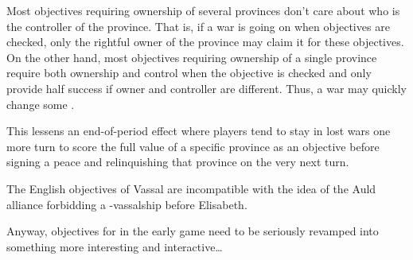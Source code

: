 \bparag Most objectives requiring ownership of several provinces don't
care about who is the controller of the province. That is, if a war is
going on when objectives are checked, only the rightful owner of the
province may claim it for these objectives.
\bparag On the other hand, most objectives requiring ownership of a
single province require both ownership and control when the objective is
checked and only provide half success if owner and controller are
different. Thus, a war may quickly change some \VPs.

\begin{designnote}
  This lessens an end-of-period effect where players tend to stay in
  lost wars one more turn to score the full \VPs value of a specific
  province as an objective before signing a peace and relinquishing that
  province on the very next turn.
\end{designnote}

\begin{todo}
  The English objectives of \paysEcosse Vassal are incompatible with the
  idea of the Auld alliance forbidding a \ANG-\paysEcosse vassalship
  before Elisabeth.

  Anyway, objectives for \ANG in the early game need to be seriously
  revamped into something more interesting and interactive\ldots
\end{todo}



\def\EUobjectives#1#2{%
  \EUcurrentcountry{#1} \csname subsection\endcsname {Objectives of
    \paysmajeur{#1}} \EUobjectivesa{I}{#2}
  \EUobjectivesa{II}{#2} \EUobjectivesa{III}{#2}
  \EUobjectivesa{IV}{#2} \EUobjectivesa{V}{#2}
  \EUobjectivesa{VI}{#2} \EUobjectivesa{VII}{#2}}
\def\EUobjectivesa#1#2{ \EUcurrentperiod{#1}
  \EUcasevalue{objective@\EUcurrcoun @\EUcurrper @1@short}{}{ \csname
    subsubsectionJ\endcsname {Period \period{#1}}{\blason{#2}}
    \EUobjectivesb{1} \EUobjectivesb{2} \EUobjectivesb{3}
    \EUobjectivesb{4} \EUobjectivesb{5} }}
\def\EUobjectivesb#1{ \EUcasevalue{objective@\EUcurrcoun @\EUcurrper
    @#1@short}{}{ \def\RES##1{##1}%
    \def\EUAbbr##1{##1}
    \aparag
    \EUvalue{objective@\EUcurrcoun @\EUcurrper @#1@short}{}%
    \EUcasevalue{objective@\EUcurrcoun @\EUcurrper @#1@letters}{%
    }{%
      (\EUvalue{objective@\EUcurrcoun @\EUcurrper @#1@letters}{})%
    }: %
    \EUcasevalue{objective@\EUcurrcoun @\EUcurrper @#1@per}{%
      \EUvalue{objective@\EUcurrcoun @\EUcurrper @#1@max}{}~\VPs%
      \EUcasevalue{objective@\EUcurrcoun @\EUcurrper @#1@score}{%
      }{%
        ~(\undemi: \EUvalue{objective@\EUcurrcoun @\EUcurrper
          @#1@score}{}~\VPs)%
      }%
    }{%
      \EUvalue{objective@\EUcurrcoun @\EUcurrper @#1@score}{} per
      \EUvalue{objective@\EUcurrcoun @\EUcurrper @#1@per}{} ~(max
      \EUvalue{objective@\EUcurrcoun @\EUcurrper @#1@max}{})%
    }%
    \EUcasevalue{objective@\EUcurrcoun @\EUcurrper @#1@desc}{%
    }{%
      ~--- \EUvalue{objective@\EUcurrcoun @\EUcurrper @#1@desc}{}.%
    }%
  } }


